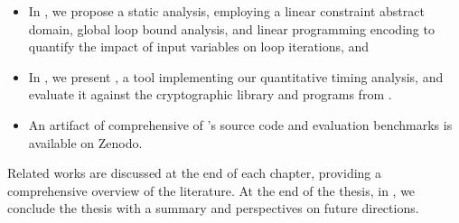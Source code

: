 \begin{itemize}
  \item In , we propose a static analysis, employing a linear constraint abstract domain, global loop bound analysis, and linear programming encoding to quantify the impact of input variables on loop iterations, and
  \item In , we present \timesec,\sidenote{\timesecurl} a tool implementing our quantitative timing analysis, and evaluate it against the \bignum{} cryptographic library\sidenote{\bignumurl} and programs from \svcomp.\sidenote{\svcompurl}
  \item An artifact of \timesec{} comprehensive of \timesec's source code and evaluation benchmarks is available on Zenodo.\sidenote{\timeseczenodo}
\end{itemize}

\frenchdiv

Related works are discussed at the end of each chapter, providing a comprehensive overview of the literature.
At the end of the thesis, in , we conclude the thesis with a summary and perspectives on future directions.
